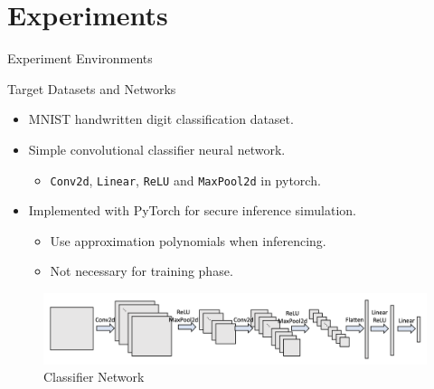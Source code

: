 \documentclass[9pt]{beamer}
\begin{document}
\section{Experiments}

\begin{frame}{Experiment Environments}
    \begin{block}{Target Datasets and Networks}
        \begin{itemize}
            \item MNIST handwritten digit classification dataset.
            \item Simple convolutional classifier neural network.
                  \begin{itemize}
                      \item \texttt{Conv2d}, \texttt{Linear}, \texttt{ReLU} and \texttt{MaxPool2d} in pytorch.
                  \end{itemize}
            \item Implemented with PyTorch for secure inference simulation.
                  \begin{itemize}
                      \item \alert{Use approximation polynomials when inferencing.}
                      \item Not necessary for training phase.
                  \end{itemize}
        \end{itemize}
    \end{block}
    \begin{figure}[!h]
        \centering
        \includegraphics[width=.95\textwidth]{resource/network.png}
        \caption{Classifier Network}
        \label{fig:network}
    \end{figure}
\end{frame}
\end{document}
